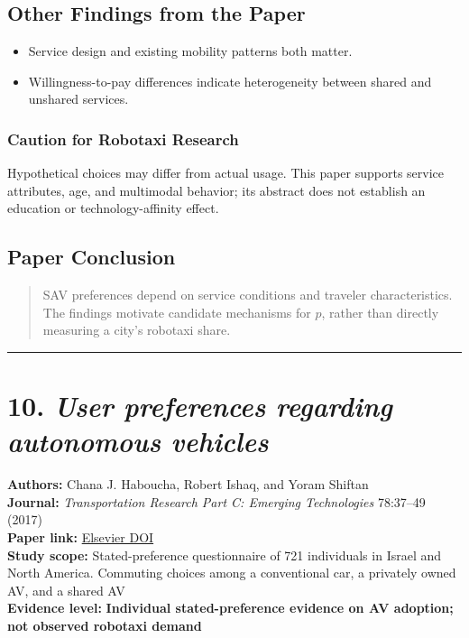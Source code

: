 \documentclass[10pt,a4paper]{article}
\providecommand{\tightlist}{\setlength{\itemsep}{0pt}\setlength{\parskip}{0pt}}
\begin{document}
\subsection{Other Findings from the Paper}

\begin{itemize}
\tightlist
\item
  Service design and existing mobility patterns both matter.
\item
  Willingness-to-pay differences indicate heterogeneity
  between shared and unshared services.
\end{itemize}

\subsubsection{Caution for Robotaxi Research}

Hypothetical choices may differ from actual usage.
This paper supports service attributes, age, and multimodal behavior;
its abstract does not establish an education or technology-affinity effect.

\subsection{Paper Conclusion}

\begin{quote}
SAV preferences depend on service conditions and traveler characteristics.
The findings motivate candidate mechanisms for $p$,
rather than directly measuring a city's robotaxi share.
\end{quote}


\begin{center}\rule{0.5\linewidth}{0.5pt}\end{center}

\hypertarget{user-preferences-regarding-autonomous-vehicles}{%
\section{\texorpdfstring{10. \emph{User preferences regarding autonomous vehicles}}{10. User preferences regarding autonomous vehicles}}\label{user-preferences-regarding-autonomous-vehicles}}

\textbf{Authors:} Chana J. Haboucha, Robert Ishaq, and Yoram Shiftan\\
\textbf{Journal:} \emph{Transportation Research Part C:
Emerging Technologies} 78:37--49 (2017)\\
\textbf{Paper link:}
\href{https://doi.org/10.1016/j.trc.2017.01.010}{Elsevier DOI}\\
\textbf{Study scope:} Stated-preference questionnaire of 721 individuals
in Israel and North America.
Commuting choices among a conventional car, a privately owned AV,
and a shared AV\\
\textbf{Evidence level:}
\textbf{Individual stated-preference evidence on AV adoption;
not observed robotaxi demand}
\end{document}
